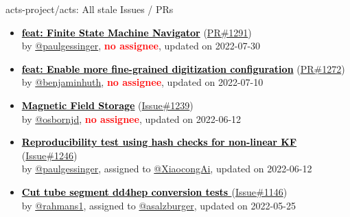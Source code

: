\begin{frame}[allowframebreaks]{ acts-project/acts: All stale Issues / PRs}
\begin{itemize}
    \item\propen\prwip\prstale
    \hspace*{0.1em}
    \textbf{\href{https://github.com/acts-project/acts/pull/1291}{\textcolor{black}{feat: Finite State Machine Navigator}}}
    (\href{https://github.com/acts-project/acts/pull/1291}{PR\#1291}) \\
    by \href{https://github.com/paulgessinger}{@paulgessinger}, {}\textbf{\textcolor{Red}{no assignee}}, updated on 2022-07-30

    \item\propen\prwip\prstale
    \hspace*{0.1em}
    \textbf{\href{https://github.com/acts-project/acts/pull/1272}{\textcolor{black}{feat: Enable more fine-grained digitization configuration}}}
    (\href{https://github.com/acts-project/acts/pull/1272}{PR\#1272}) \\
    by \href{https://github.com/benjaminhuth}{@benjaminhuth}, {}\textbf{\textcolor{Red}{no assignee}}, updated on 2022-07-10

    \item\iss\prstale
    \hspace*{0.1em}
    \textbf{\href{https://github.com/acts-project/acts/issues/1239}{\textcolor{black}{Magnetic Field Storage}}}
    (\href{https://github.com/acts-project/acts/issues/1239}{Issue\#1239}) \\
    by \href{https://github.com/osbornjd}{@osbornjd}, {}\textbf{\textcolor{Red}{no assignee}}, updated on 2022-06-12

    \item\iss\prstale
    \hspace*{0.1em}
    \textbf{\href{https://github.com/acts-project/acts/issues/1246}{\textcolor{black}{Reproducibility test using hash checks for non-linear KF}}}
    (\href{https://github.com/acts-project/acts/issues/1246}{Issue\#1246}) \\
    by \href{https://github.com/paulgessinger}{@paulgessinger}, {}assigned to \href{https://github.com/XiaocongAi}{@XiaocongAi}, updated on 2022-06-12

    \item\iss\prstale
    \hspace*{0.1em}
    \textbf{\href{https://github.com/acts-project/acts/issues/1146}{\textcolor{black}{Cut tube segment dd4hep conversion tests }}}
    (\href{https://github.com/acts-project/acts/issues/1146}{Issue\#1146}) \\
    by \href{https://github.com/rahmans1}{@rahmans1}, {}assigned to \href{https://github.com/asalzburger}{@asalzburger}, updated on 2022-05-25


\end{itemize}
\end{frame}
